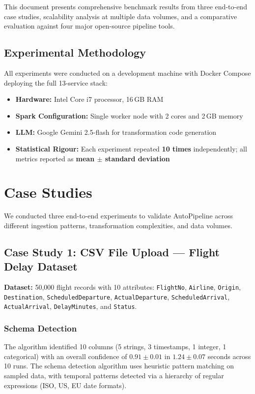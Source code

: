 \documentclass[12pt, a4paper]{article}
\begin{document}
This document presents comprehensive benchmark results from three end-to-end case studies, scalability analysis at multiple data volumes, and a comparative evaluation against four major open-source pipeline tools.

\subsection{Experimental Methodology}

All experiments were conducted on a development machine with Docker Compose deploying the full 13-service stack:
\begin{itemize}
    \item \textbf{Hardware:} Intel Core i7 processor, 16\,GB RAM
    \item \textbf{Spark Configuration:} Single worker node with 2 cores and 2\,GB memory
    \item \textbf{LLM:} Google Gemini 2.5-flash for transformation code generation
    \item \textbf{Statistical Rigour:} Each experiment repeated \textbf{10 times} independently; all metrics reported as \textbf{mean $\pm$ standard deviation}
\end{itemize}


\section{Case Studies}

We conducted three end-to-end experiments to validate AutoPipeline across different ingestion patterns, transformation complexities, and data volumes.

\subsection{Case Study 1: CSV File Upload --- Flight Delay Dataset}

\textbf{Dataset:} 50,000 flight records with 10 attributes: \texttt{FlightNo}, \texttt{Airline}, \texttt{Origin}, \texttt{Destination}, \texttt{ScheduledDeparture}, \texttt{ActualDeparture}, \texttt{ScheduledArrival}, \texttt{ActualArrival}, \texttt{DelayMinutes}, and \texttt{Status}.

\subsubsection{Schema Detection}
The algorithm identified 10 columns (5 strings, 3 timestamps, 1 integer, 1 categorical) with an overall confidence of $0.91 \pm 0.01$ in $1.24 \pm 0.07$ seconds across 10 runs. The schema detection algorithm uses heuristic pattern matching on sampled data, with temporal patterns detected via a hierarchy of regular expressions (ISO, US, EU date formats).
\end{document}
